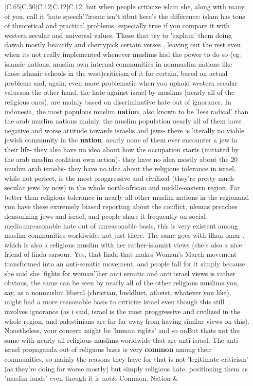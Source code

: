 \documentclass[11pt]{article}
\newlength\mylength
\begin{document}
\begin{center}
\begin{longtable}{|C{.65\mylength}|C{.30\mylength}|C{.12\mylength}|C{.12\mylength}|C{.12\mylength}|}
  \small but when people criticize islam she, along with many of you, call it 'hate speech'?ironic isn't itbut here's the difference: islam has tons of theoretical and practical problems, especially true if you compare it with western secular and universal values. Those that try to 'explain' them doing dawah mostly beautify and cherrypick certain verses , leaving out the rest even when its not really implemented whenever muslims had the power to do so (eg: islamic nations, muslim own internal communities in nonmuslim nations like those islamic schools in the west)criticism of it for certain, based on actual problems and, again, even more problematic when you uphold western secular valueson the other hand, the hate against israel by muslims (nearly all of the religious ones), are mainly based on discriminative hate out of ignorance. In indonesia, the most populous muslim \textbf{nation}, also known to be 'less radical' than the arab muslim nations mainly, the muslim population nearly all of them have negative and worse attitude towards israelis and jews- there is literally no viable jewish community in the \textbf{nation}, nearly none of them ever encounter a jew in their life- they also have no idea about how the occupation starts (initiated by the arab muslim coalition own action)- they have no idea mostly about the 20 muslim arab israelis- they have no idea about the religious tolerance in israel, while not perfect, is the most proggressive and civilized (they're pretty much secular jews by now) in the whole north-african and middle-eastern region. Far better than religious tolerance in nearly all other muslim nations in the regionand you have these extremely biased reporting about the conflict, ulemas preaches demonizing jews and israel, and people share it frequently on social mediaunreasonable hate out of unreasonable basis, this is very existent among muslim communities worldwide, not just there. The same goes with ilhan omar , which is also a religious muslim with her rather-islamist views (she's also a nice friend of linda sarsour. Yes, that linda that makes Woman's March movement transformed into an anti-semitic movement, and people fall for it simply because she said she 'fights for woman')her anti semitic and anti israel views is rather obvious, the same can be seen by nearly all of the other religious muslims you, say, as a nonmuslim liberal (christian, buddhist, atheist, whatever you like), might had a more reasonable basis to criticize israel even though this still involves ignorance (as i said, israel is the most proggressive and civilized in the whole region, and palestinians are far far away from having similar views on this). Nonetheless, your concern might be 'human rights' and so onBut thats not the same with nearly all religious muslims worldwide that are anti-israel. The anti-israel propaganda out of religious basis is very \textbf{common} among their communities, so mainly the reasons they have for that is not 'legitimate criticism' (as they're doing far worse mostly) but simply religious hate, positioning them as 'muslim lands' even though it is not\normalsize   & Common, Nation & 
\end{longtable}
\end{center}
\end{document}
